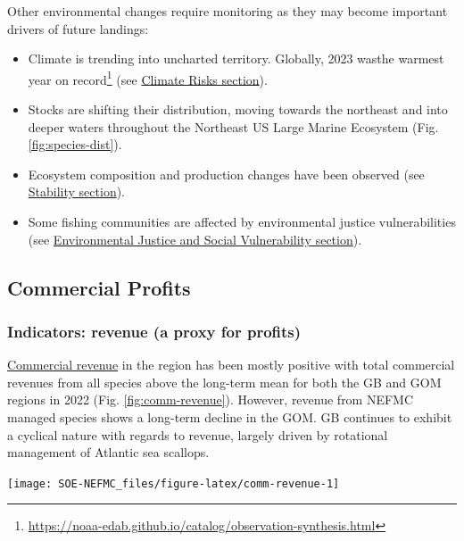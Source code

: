 \documentclass[
  10pt,
]{article}
\providecommand{\tightlist}{%
  \setlength{\itemsep}{0pt}\setlength{\parskip}{0pt}}
\let\origfigure\figure
\let\endorigfigure\endfigure
\renewenvironment{figure}[1][2] {
    \expandafter\origfigure\expandafter[H]
} {
    \endorigfigure
}
\begin{document}
Other environmental changes require monitoring as they may become important drivers of future landings:

\begin{itemize}
\tightlist
\item
  Climate is trending into uncharted territory. Globally, 2023 wasthe warmest year on record\footnote{\url{https://noaa-edab.github.io/catalog/observation-synthesis.html}} (see \protect\hyperlink{climate-and-ecosystem-productivity}{Climate Risks section}).
\item
  Stocks are shifting their distribution, moving towards the northeast and into deeper waters throughout the Northeast US Large Marine Ecosystem (Fig. \ref{fig:species-dist}).
\item
  Ecosystem composition and production changes have been observed (see \protect\hyperlink{stability}{Stability section}).
\item
  Some fishing communities are affected by environmental justice vulnerabilities (see \protect\hyperlink{social-vulnerability}{Environmental Justice and Social Vulnerability section}).
\end{itemize}

\newpage

\hypertarget{commercial-profits}{%
\subsection{Commercial Profits}\label{commercial-profits}}

\hypertarget{indicators-revenue-a-proxy-for-profits}{%
\subsubsection{Indicators: revenue (a proxy for profits)}\label{indicators-revenue-a-proxy-for-profits}}

\href{https://noaa-edab.github.io/catalog/commercial-landings-and-revenue.html}{Commercial revenue} in the region has been mostly positive with total commercial revenues from all species above the long-term mean for both the GB and GOM regions in 2022 (Fig. \ref{fig:comm-revenue}). However, revenue from NEFMC managed species shows a long-term decline in the GOM. GB continues to exhibit a cyclical nature with regards to revenue, largely driven by rotational management of Atlantic sea scallops.

\begin{figure}

{\centering \texttt{[image: SOE-NEFMC\_files/figure-latex/comm-revenue-1]} 

}

\caption{Revenue through 2022 for the New England region: total (black) and from NEFMC managed species (red).}\label{fig:comm-revenue}
\end{figure}
\end{document}

